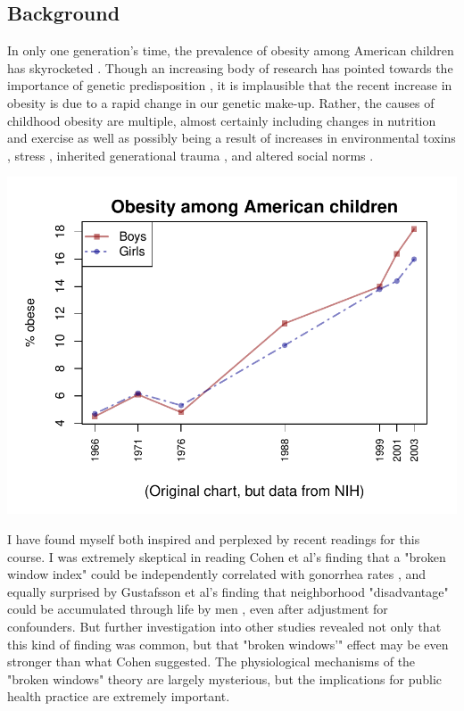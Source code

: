 \documentclass[11pt]{article}
\begin{document}
\begin{multicols}{2} 



\subsection*{Background}

In only one generation's time, the prevalence of obesity among American children has skyrocketed \cite{NIH,Ogden2014}.   Though an increasing body of research has pointed towards the importance of genetic predisposition \cite{Bonnet2014}, it is implausible that the recent increase in obesity is due to a rapid change in our genetic make-up.  Rather, the causes of childhood obesity are multiple, almost certainly including changes in nutrition and exercise as well as possibly being a result of increases in environmental toxins \cite{Mller2014}, stress \cite{Walton2014}, inherited generational trauma \cite{Taveras2010}, and altered social norms \cite{Levine2011,Bevelander2012}.  


\begin{center}
\includegraphics{data_proposal_brew-002}
\end{center}

I have found myself both inspired and perplexed by recent readings for this course.  I was extremely skeptical in reading Cohen et al's finding that a "broken window index" could be independently correlated with gonorrhea rates \cite{Cohen2000}, and equally surprised by Gustafsson et al's finding that neighborhood "disadvantage" could be accumulated through life by men , even after adjustment for confounders. \cite{Gustafsson2014}  But further investigation into other studies revealed not only that this kind of finding was common, but that "broken windows'" effect may be even stronger than what Cohen suggested. \cite{Boggess2014}  The physiological mechanisms of the "broken windows" theory are largely mysterious, \cite{Kotabe2014} \cite{OBrien2012} but the implications for public health practice are extremely important. \\


\end{multicols}
\end{document}
